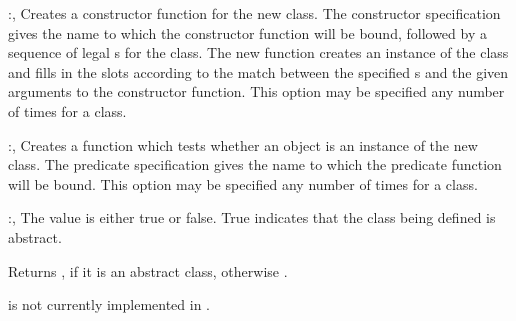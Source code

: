 \begin{optDefinition}
\begin{options}
    \item[\keyworddef{constructor}:, \scref{constructor-specification}]%
    Creates a constructor function for the new class.  The constructor
    specification gives the name to which the constructor function will be
    bound, followed by a sequence of legal s for the class.  The
    new function creates an instance of the class and fills in the slots
    according to the match between the specified s and the given
    arguments to the constructor function.  This option may be specified any
    number of times for a class.

    \item[\keyworddef{predicate}:, \scref{identifier}]%
    Creates a function which tests whether an object is an instance of the new
    class.  The predicate specification gives the name to which the predicate
    function will be bound.  This option may be specified any number of times
    for a class.

    \item[\keyworddef{abstractp}:, \scref{boolean}]%
    The value is either true or false. True indicates that the class being
    defined is abstract.
%
\end{options}
%
\end{optDefinition}
%
%
\Signature
{}
%
%
\begin{arguments}
    \item[\scref{object}] Returns , if it is an abstract class,
    otherwise \nil{}.
\end{arguments}
%
\begin{note}
     is not currently implemented in \youtoo.
\end{note}
%
